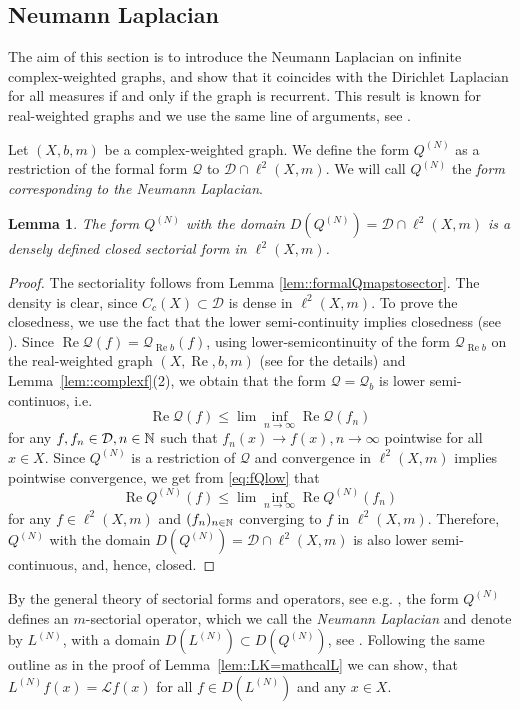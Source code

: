 \documentclass[a4paper,11pt]{amsart}
\newtheorem{lemma}[theorem]{Lemma}
\theoremstyle{definition}
\renewcommand{\Re}{\operatorname{Re}}%
\newcommand{\D}{\mathcal{D}}
\newcommand{\Q}{\mathcal{Q}}
\begin{document}
\subsection{Neumann Laplacian}
The aim of this section is to  introduce the Neumann Laplacian on infinite complex-weighted graphs, and show that it coincides with the Dirichlet Laplacian for all measures if and only if the graph is recurrent. This result is known for real-weighted graphs and we use the same line of arguments, see \cite[Theorem 6.1]{KellerLenzWojcBook}. 

Let $(X,b,m)$ be a complex-weighted graph. We define the form $Q^{(N)}$ as a restriction of the formal form $\Q$ to $\mathcal D\cap \ell^2(X,m)$. We will call $Q^{(N)}$ the {\em form corresponding to the Neumann Laplacian}.

\begin{lemma}
The form $Q^{(N)}$ with the domain $D(Q^{(N)})=\mathcal D\cap \ell^2(X,m)$ is a densely defined closed sectorial form in $\ell^2(X,m)$.
\end{lemma}
\begin{proof}
The sectoriality follows from Lemma \ref{lem::formalQmapstosector}. The density is clear, since $C_c(X)\subset \D$ is dense in $\ell^2(X,m)$. To  prove the closedness, we use the fact that  the lower semi-continuity implies closedness (see \cite[Theorem B.9, proof (ii)$\Rightarrow$(iii)]{KellerLenzWojcBook}). Since $\Re \Q(f)=\Q_{\Re b}(f)$, using lower-semicontinuity of the form $\Q_{\Re b}$ on the real-weighted graph $(X,\Re,b,m)$ (see \cite[Proposition 1.3]{KellerLenzWojcBook} for the details) and  Lemma~\ref{lem::complexf}(2),  we obtain that the form $\Q=\Q_b$ is lower semi-continuos, i.e.
\begin{equation}\label{eq:fQlow}
\Re \Q(f)\le \lim \inf_{n\to \infty} \Re \Q(f_n)
\end{equation}
for any $f, f_n\in \D, n\in \Bbb N$ such that $f_n(x)\to f(x), n\to \infty$ pointwise for all $x\in X$. Since $Q^{(N)}$ is a restriction of $\Q$ and convergence in $\ell^2(X,m)$ implies pointwise convergence, we get from \eqref{eq:fQlow} that 
$$
\Re Q^{(N)}(f)\le \lim \inf_{n\to \infty} \Re Q^{(N)}(f_n)
$$
for any  $f\in \ell^2(X,m)$ and $(f_n)_{n\in \Bbb N}$ converging to $f$ in $\ell^2(X,m)$. Therefore, $Q^{(N)}$ with the domain $D(Q^{(N)})=\mathcal D\cap \ell^2(X,m)$ is also lower semi-continuous, and, hence, closed.
\end{proof}



By the general theory of sectorial forms and operators, see e.g. \cite{Kato}, the form $Q^{(N)}$ defines an $m$-sectorial operator, which we call  the {\em Neumann Laplacian} and denote by $L^{(N)}$, with a domain $D(L^{(N)})\subset D(Q^{(N)})$, see \cite[p. 322, Theorem 2.1]{Kato}.
Following the same outline as in the proof of Lemma~\ref{lem::LK=mathcalL} we can show, that $L^{(N)}f(x)=\mathcal Lf(x)$ for all $f\in D(L^{(N)})$ and any $x\in X$.
\end{document}
